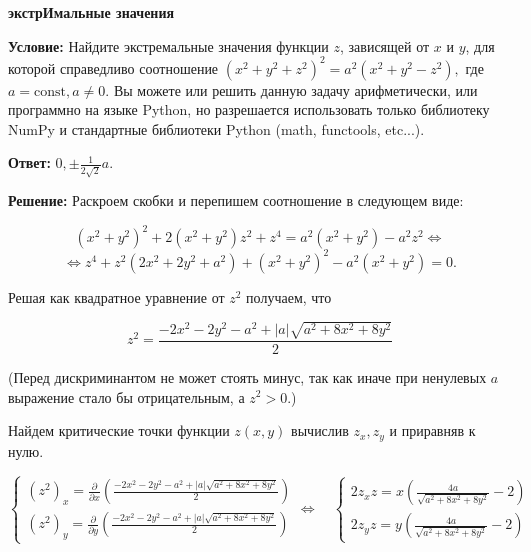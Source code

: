 \documentclass{exam}
\begin{document}
    
\textbf{экстрИмальные значения}

\textbf{Условие:} Найдите экстремальные значения функции $z$, зависящей от $x$ и $y$, для которой справедливо соотношение $\left(x^2 + y^2 + z^2\right)^2 = a^2\left(x^2 + y^2 - z^2\right),$ где $a = \mathrm{const}, a \ne 0$. Вы можете или решить данную задачу арифметически, или программно на языке Python, но разрешается использовать только библиотеку NumPy и стандартные библиотеки Python (math, functools, etc...).

\textbf{Ответ:} $0, \pm\frac{1}{2\sqrt{2}}a$.

\textbf{Решение:} Раскроем скобки и перепишем соотношение в следующем виде:

$$\left(x^2 + y^2\right)^2 + 2\left(x^2 + y^2\right) z^2 + z^4 = a^2\left(x^2 + y^2\right) - a^2z^2 \iff $$
$$\iff z^4 + z^2\left(2x^2 + 2y^2 + a^2\right) + \left(x^2 + y^2\right)^2 - a^2\left(x^2 + y^2\right) = 0.$$

Решая как квадратное уравнение от $z^2$ получаем, что

\begin{equation}
    z^2 = \displaystyle\frac{-2x^2 - 2y^2 - a^2 + |a| \sqrt{a^2 + 8x^2 + 8y^2}}{2} \tag{$*$}
\end{equation}

(Перед дискриминантом не может стоять минус, так как иначе при ненулевых $a$ выражение стало бы отрицательным, а $z^2 > 0$.)

Найдем критические точки функции $z(x, y)$ вычислив $z_x, z_y$ и приравняв к нулю.

\begin{equation*}
    \begin{cases}
        \left(z^2\right)_{x} = \frac{\partial}{\partial x} \left( \frac{-2x^2 - 2y^2 - a^2 + |a| \sqrt{a^2 + 8x^2 + 8y^2}}{2} \right) \\[20pt]
 
        \left(z^2\right)_{y} = \frac{\partial}{\partial y}\left( \frac{-2x^2 - 2y^2 - a^2 + |a| \sqrt{a^2 + 8x^2 + 8y^2}}{2} \right)

    \end{cases}
    \iff\quad
    \begin{cases}
        2z_{x}z = x \left(
        \frac{4a}{\sqrt{a^2 + 8x^2 + 8y^2}} - 2
        \right) \\[20pt]
 
        2z_{y}z = y \left(
        \frac{4a}{\sqrt{a^2 + 8x^2 + 8y^2}} - 2
        \right)
    \end{cases}
\end{equation*}
\end{document}
